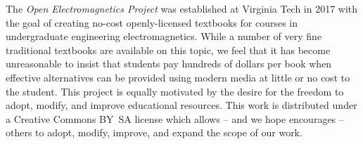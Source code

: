 

\label{m0148_Preface-About_OpenEM} %

The \emph{Open Electromagnetics Project} %
was established at Virginia Tech in 2017 with the goal of creating no-cost openly-licensed textbooks for courses in undergraduate engineering electromagnetics.
While a number of very fine traditional textbooks are available on this topic, we feel that it has become unreasonable to insist that students pay hundreds of dollars per book when effective alternatives can be provided using modern media at little or no cost to the student.
This project is equally motivated by the desire for the freedom to adopt, modify, and improve educational resources.
This work is distributed under a Creative Commons BY~SA license which allows -- and we hope encourages -- others to adopt, modify, improve, and expand the scope of our work.



